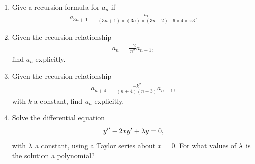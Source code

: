 \documentclass{book}
\begin{document}
\begin{enumerate}
%
%

  \item
    Give a recursion formula for $a_n$ if
    \begin{align*}
    a_{3n+1} = \frac{a_1}{(3n+1)\times (3n) \times (3n-2) \dots
      6 \times 4 \times \times 3}.
    \end{align*}

  \item
    Given the recursion relationship
    \begin{align*}
    a_n = \frac{-2}{n^2}a_{n-1},
    \end{align*}
    find $a_n$ explicitly.

  \item
    Given the recursion relationship
    \begin{align*}
    a_{n+4} = \frac{-k^2}{(n+4)(n+3)} a_{n-1},
    \end{align*}
    with $k$ a constant, find $a_n$ explicitly.

  \item Solve the differential equation
    \begin{align*}
    y'' - 2 x y' + \lambda y=0,
    \end{align*}
    with $\lambda$ a constant, using a Taylor series about $x=0$. For what values
    of $\lambda$ is the solution a polynomial?

\end{enumerate}
\end{document}
